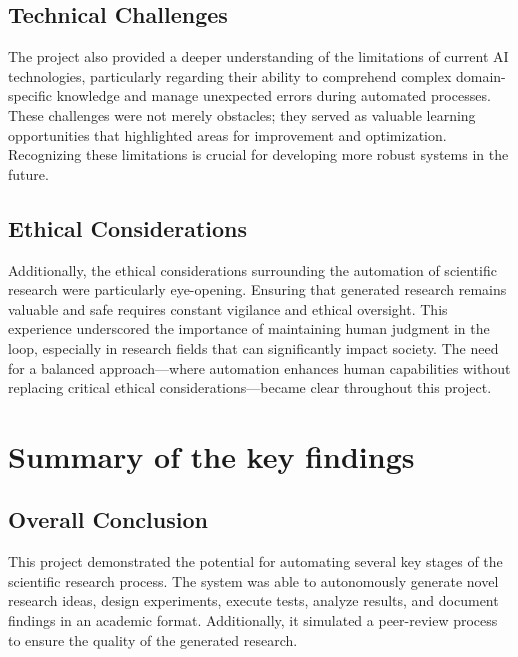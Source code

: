 \subsection{Technical Challenges}
The project also provided a deeper understanding of the limitations of current AI technologies, particularly regarding their ability to comprehend complex domain-specific knowledge and manage unexpected errors during automated processes. These challenges were not merely obstacles; they served as valuable learning opportunities that highlighted areas for improvement and optimization. Recognizing these limitations is crucial for developing more robust systems in the future.

\subsection{Ethical Considerations}
Additionally, the ethical considerations surrounding the automation of scientific research were particularly eye-opening. Ensuring that generated research remains valuable and safe requires constant vigilance and ethical oversight. This experience underscored the importance of maintaining human judgment in the loop, especially in research fields that can significantly impact society. The need for a balanced approach—where automation enhances human capabilities without replacing critical ethical considerations—became clear throughout this project.

\section{Summary of the key findings}
\subsection{Overall Conclusion}
This project demonstrated the potential for automating several key stages of the scientific research process. The system was able to autonomously generate novel research ideas, design experiments, execute tests, analyze results, and document findings in an academic format. Additionally, it simulated a peer-review process to ensure the quality of the generated research.

